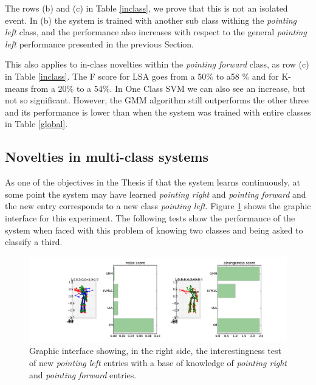 The rows (b) and (c) in Table \ref{inclass}, we prove that this is not an isolated event. In (b) the system is trained with another sub class withing the \emph{pointing left} class, and the performance also increases with respect to the general \emph{pointing left} performance presented in the previous Section.


This also applies to in-class novelties within the \emph{pointing forward} class, as row (c) in Table \ref{inclass}. The F score for LSA goes from a 50$\%$ to a58 $\%$ and for K-means from a  20$\%$ to a 54$\%$. In One Class SVM we can also see an increase, but not so significant. However, the GMM algorithm still outperforms the other three and its performance is lower than when the system was trained with entire classes in Table \ref{global}.


\subsection{Novelties in multi-class systems}

As one of the objectives in the Thesis if that the system learns continuously, at some point the system may have learned \emph{pointing right} and \emph{pointing forward} and the new entry corresponds to a new class \emph{pointing left}. Figure \ref{fig:two} shows the graphic interface for this experiment. The following tests show the performance of the system when faced with this problem of knowing two classes and being asked to classify a third.

\begin{figure}[h]
\includegraphics[width=15cm]{Figures/results_two/two_classes}
\centering
\caption[Graphic interface for multi-class systems]{Graphic interface showing, in the right side, the interestingness test of new \emph{pointing left} entries with a base of knowledge of \emph{pointing right} and \emph{pointing forward} entries.\label{fig:two}}
\end{figure}

